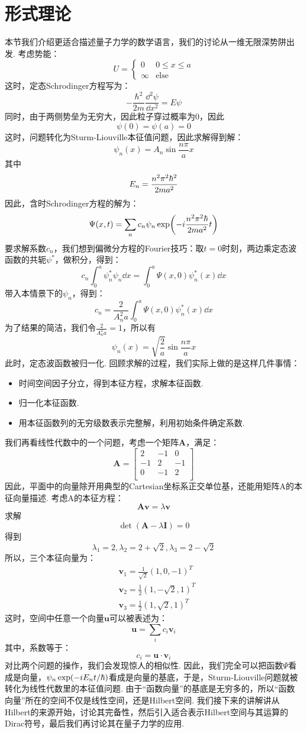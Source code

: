 \chapter{形式理论}
本节我们介绍更适合描述量子力学的数学语言，我们的讨论从一维无限深势阱出发. 考虑势能：
\[
U = 
\begin{cases}
0 & 0\leq x \leq a \\
\infty & \mathrm{else}
\end{cases}
\]
这时，定态Schrodinger方程写为：
\[
-\frac{\hbar^2}{2m}\frac{\dd^2\psi}{\dd x^2} = E\psi
\]
同时，由于两侧势垒为无穷大，因此粒子穿过概率为0，因此
\[
\psi(0) = \psi(a) = 0
\]
这时，问题转化为Sturm-Liouville本征值问题，因此求解得到解：
\[
\psi_{n}(x) = A_{n}\sin\frac{n\pi}{a}x
\]
其中
\[
E_{n} = \frac{n^2\pi^2\hbar^2}{2ma^2}
\]
因此，含时Schrodinger方程的解为：
\[
\Psi(x,t) = \sum_{n}c_{n}\psi_{n}\exp(-i\frac{n^2\pi^2\hbar}{2ma^2}t)
\]
要求解系数\(c_{n}\)，我们想到偏微分方程的Fourier技巧：取\(t=0\)时刻，两边乘定态波函数的共轭\(\psi^{*}\)，做积分，得到：
\[
c_{n}\int_{0}^{a}\psi_{n}^{*}\psi_{n}\dd x = \int_{0}^{a}\Psi(x,0)\psi_{n}^{*}(x)\dd x
\]
带入本情景下的\(\psi_{n}\)，得到：
\[
c_{n} = \frac{2}{A_{n}^{2}a}\int_{0}^{a}\Psi(x,0)\psi_{n}^{*}(x)\dd x
\]
为了结果的简洁，我们令\(\frac{2}{A_{n}^{2}a}=1\)，所以有
\[
\psi_{n}(x) = \sqrt{\frac{2}{a}}\sin\frac{n\pi}{a}x
\]
此时，定态波函数被归一化. 回顾求解的过程，我们实际上做的是这样几件事情：
\begin{itemize}
    \item 时间空间因子分立，得到本征方程，求解本征函数. 
    \item 归一化本征函数.
    \item 用本征函数列的无穷级数表示完整解，利用初始条件确定系数. 
\end{itemize}
我们再看线性代数中的一个问题，考虑一个矩阵\(\mathbf{A}\)，满足：
\[
\mathbf{A}
= \begin{bmatrix}
2 & -1 & 0 \\
-1 & 2 & -1 \\
0 & -1 & 2\\
\end{bmatrix}
\]
因此，平面中的向量除开用典型的Cartesian坐标系正交单位基，还能用矩阵A的本征向量描述. 考虑A的本征方程：
\[
\mathbf{A}\mathbf{v} = \lambda\mathbf{v}
\]
求解
\[
\det(\mathbf{A}-\lambda\mathbf{I}) = 0
\]
得到
\[
\lambda_{1} = 2 , \lambda_{2} = 2+\sqrt{2}, \lambda_{3} = 2-\sqrt{2}
\]
所以，三个本征向量为：
\begin{align*}
& \mathbf{v}_{1} = \frac{1}{\sqrt{2}}(1, 0, -1)^{T} \\
& \mathbf{v}_{2} = \frac{1}{2}(1, -\sqrt{2}, 1)^{T} \\
& \mathbf{v}_{3} = \frac{1}{2}(1, \sqrt{2}, 1)^{T}
\end{align*}
这时，空间中任意一个向量\(\mathbf{u}\)可以被表述为：
\[
\mathbf{u} = \sum_{i}c_{i}\mathbf{v}_{i}
\]
其中，系数等于：
\[
c_{i} = {\mathbf{u}\cdot\mathbf{v}_{i}}
\]
对比两个问题的操作，我们会发现惊人的相似性. 因此，我们完全可以把函数\(\Psi\)看成是向量，\(\psi_{n}\exp(-iE_{n}t/\hbar)\)看成是向量的基底，于是，Sturm-Liouville问题就被转化为线性代数里的本征值问题. 由于“函数向量”的基底是无穷多的，所以“函数向量”所在的空间不仅是线性空间，还是Hilbert空间. 我们接下来的讲解讲从Hilbert的来源开始，讨论其完备性，然后引入适合表示Hilbert空间与其运算的Dirac符号，最后我们再讨论其在量子力学的应用. 
